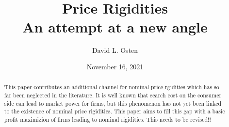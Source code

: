 \documentclass[ProjectDLO]{subfiles}
\begin{document}
\providecommand{\versn}{pdf} %
\ifthenelse{\boolean{Web}}{    %
  \renewcommand{\versn}{Web}     %
  \renewcommand{\rootFromOut}{.} %
}{}  %


\title{Price Rigidities \\ An attempt at a new angle}

\author{David L. Osten\authNum}



\renewcommand{\forcedate}{November 16, 2021}\date{\forcedate}

\maketitle
\hypertarget{abstract}{}
\begin{abstract}
This paper contributes an additional channel for nominal price rgidities which has so far been neglected in the literature. It is well known that search cost on the consumer side can lead to market power for firms, but this phenomenon has not yet been linked to the existence of nominal price rigidities. This paper aims to fill this gap with a basic profit maximizion of firms leading to nominal rigidities. This needs to be revised!!
\end{abstract}


\hypertarget{links}{}
\end{document}
